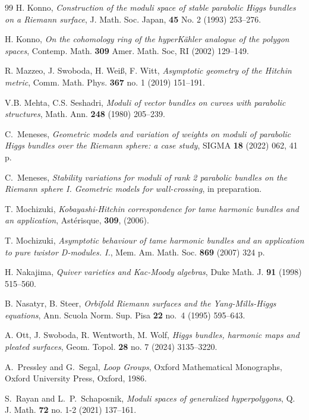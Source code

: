 \documentclass[12pt,a4paper]{amsart}
\theoremstyle{definition}
\theoremstyle{remark}
\begin{document}
\begin{thebibliography}{99}
 H. Konno, {\em Construction of the moduli space of stable parabolic Higgs bundles on a Riemann surface},
J. Math. Soc. Japan, \textbf{45} No. 2 (1993) 253--276.

 H. Konno, {\em On the cohomology ring of the hyperK\"ahler analogue of the polygon spaces}, 
Contemp. Math. \textbf{309} Amer. Math. Soc,  RI (2002) 129--149.

R. Mazzeo, J. Swoboda, H. Wei\ss , F. Witt, {\em Asymptotic geometry of the Hitchin metric},
Comm. Math. Phys. \textbf{367} no. 1 (2019) 151--191.

 V.B. Mehta, C.S. Seshadri, {\em Moduli of vector bundles on curves with parabolic structures}, Math. Ann.
\textbf{248} (1980) 205--239.

C.~Meneses,
\emph{Geometric models and variation of weights on moduli of parabolic Higgs bundles over the Riemann sphere: a case study},
SIGMA 
\textbf{18} (2022) 062, 41 p.

C.~Meneses, \emph{Stability variations for moduli of rank 2 parabolic bundles on the Riemann sphere I. Geometric models for wall-crossing}, in preparation.

T.
Mochizuki, {\em Kobayashi-Hitchin correspondence for tame harmonic bundles and an application},
Ast{\'e}risque,
{\bf 309},
(2006).

 T.
Mochizuki, {\em 
Asymptotic behaviour of tame harmonic bundles and an application to pure twistor D-modules. I.}, 
Mem. Am. Math. Soc. \textbf{869} (2007) 324 p.

 H. Nakajima, {\em Quiver varieties and Kac-Moody algebras}, Duke Math. J. \textbf{91} (1998) 515--560.

 B. Nasatyr,  B. Steer, {\em Orbifold Riemann surfaces and the Yang-Mills-Higgs equations}, Ann. Scuola Norm. Sup. Pisa \textbf{22} no.~4 (1995) 595--643.

 A. Ott, J. Swoboda, R. Wentworth, M. Wolf, {\em Higgs bundles, harmonic maps and pleated surfaces}, Geom.
Topol. \textbf{28} no. 7 (2024) 3135--3220.

A.~Pressley and G.~Segal,
\emph{Loop Groups},
Oxford Mathematical Monographs,
Oxford University Press, Oxford, 1986.

S.~Rayan and L.~P.~Schaposnik, {\em Moduli spaces of generalized hyperpolygons}, Q. J. Math. \textbf{72}
no. 1-2 (2021) 137--161.


\end{thebibliography}
\end{document}
